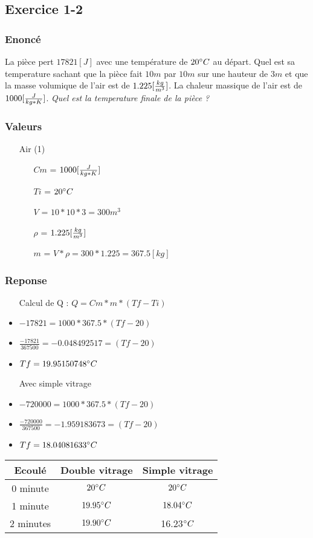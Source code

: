 \subsection{Exercice 1-2}
\subsubsection{Enoncé}
La pièce pert $17821[J]$ avec une température de $20\celsius$ au départ. Quel est sa temperature sachant que la pièce fait $10m$ par $10m$ sur une hauteur de $3m$ et que la masse volumique de l'air est de $1.225[\mv]$. La chaleur massique de l'air est de $1000[\cm]$.
\textit{Quel est la temperature finale de la pièce ?}
\subsubsection{Valeurs}
\begin{itemize}
    \item[Air] (1)
    \item[] 
    \begin{itemize}
        \item[$Cm$] = $1000[\cm]$
        \item[$Ti$] = $20\celsius$
        \item[$V$] = $10*10*3 = 300m^3$
        \item[$\rho$] = $1.225[\mv]$   
        \item[$m$] = $V * \rho = 300*1.225 = 367.5[kg]$ 
    \end{itemize}
\end{itemize}
\subsubsection{Reponse}
\begin{itemize}
    \item[Calcul de Q] : $Q = Cm * m * (Tf-Ti)$
    \item $-17821 = 1000 * 367.5 * (Tf - 20)$
    \item $\frac{-17821}{367500} = -0.048492517 = (Tf-20)$
    \item $Tf = 19.95150748\celsius$
    \item[Avec simple vitrage]
    \item $-720000 = 1000 * 367.5 * (Tf - 20)$
    \item $\frac{-720000}{367500} = -1.959183673 = (Tf-20)$
    \item $Tf = 18.04081633\celsius$
\end{itemize}
\begin{tabular}{|c|c|c|}
    \hline
    Ecoulé & Double vitrage & Simple vitrage \\
    \hline
    0 minute & $20\celsius$ & $20\celsius$ \\
    \hline
    1 minute & $19.95\celsius$ & $18.04\celsius$ \\
    \hline
    2 minutes & $19.90\celsius$ & 16.23$\celsius$ \\
    \hline
\end{tabular}